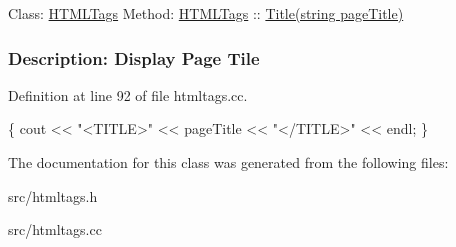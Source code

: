  Class\-: \hyperlink{classHTMLTags}{H\-T\-M\-L\-Tags} Method\-: \hyperlink{classHTMLTags}{H\-T\-M\-L\-Tags} \-:\-: \hyperlink{classHTMLTags_a5128d6f1c6be5ac1689047fc9d0d159f_a5128d6f1c6be5ac1689047fc9d0d159f}{Title(string page\-Title)} \subsubsection*{Description\-: Display Page Tile}

Definition at line 92 of file htmltags.\-cc.


\begin{DoxyCode}
\{
    cout << \textcolor{stringliteral}{"<TITLE>"} << pageTitle << \textcolor{stringliteral}{"</TITLE>"} << endl;
\}
\end{DoxyCode}


The documentation for this class was generated from the following files\-:\begin{DoxyCompactItemize}
\item 
src/htmltags.\-h\item 
src/htmltags.\-cc\end{DoxyCompactItemize}
